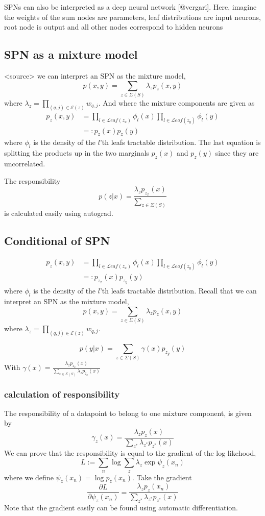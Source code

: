 SPNs can also be interpreted as a deep neural network [@vergari]. Here, imagine the
weights of the sum nodes are parameters, leaf distributions are input neurons, root node is output and
all other nodes correspond to hidden neurons

\subsection{SPN as a mixture model}
<source> we can interpret an SPN as the mixture model, 
$$p(x,y) = \sum_{z \in \Sigma(S)} \lambda_z p_z(x,y)$$
where $\lambda_z = \prod_{(q,j) \in \mathcal{E}(z)} w_{q,j}$. And where
the mixture components are given as 
\begin{align*}
    p_z(x,y) &= \prod_{l \in \mathcal{L}eaf(z_x)} \phi_l(x)\prod_{l \in \mathcal{L}eaf(z_y)} \phi_l(y)\\
            &=: p_{z}(x) p_{z}(y) 
\end{align*}
where $\phi_l$ is the density of the $l$'th leafs tractable distribution. The last equation
is splitting the products up in the two marginals $p_z(x)$ and $p_z(y)$ since they are uncorrelated. 

The responsibility 
$$p(z|x) = \frac{ \lambda_z p_{z_x}(x)}{\sum_{z \in \Sigma(S)} }$$
is calculated easily using autograd. 

\subsection{Conditional of SPN}
\begin{align*}
    p_z(x,y) &= \prod_{l \in \mathcal{L}eaf(z_x)} \phi_l(x)\prod_{l \in \mathcal{L}eaf(z_y)} \phi_l(y)\\
            &=: p_{z_x}(x) p_{z_y}(y) 
\end{align*}
where $\phi_l$ is the density of the $l$'th leafs tractable distribution. Recall that we can interpret an SPN
as the mixture model, 
$$p(x,y) = \sum_{z \in \Sigma(S)} \lambda_z p_z(x,y)$$
where $\lambda_z = \prod_{(q,j) \in \mathcal{E}(z)} w_{q,j}$.

$$p(y|x)=\sum_{z \in \Sigma(S)} \gamma(x) p_{z_y}(y)$$
With $\gamma(x) = \frac{ \lambda_z p_{z_x}(x)}{\sum_{z \in \Sigma(S)} \lambda_z p_{z_x}(x)}$ 

\subsubsection{calculation of responsibility}
The responsibility of a datapoint to belong to one mixture component, is given by
$$\gamma_z(x) = \frac{\lambda_z p_z(x)}{\sum_{z^*} \lambda_{z^*} p_{z^*}(x)}$$
We can prove that the responsibility is equal to the gradient of the log likehood, 
$$L:= \sum_n \log \sum_z \lambda_z \exp \psi_z(x_n)$$
where we define $\psi_z(x_n) = \log p_z(x_n)$. Take the gradient 
$$\frac{\partial L}{\partial \psi_{z}(x_{n})} = \frac{\lambda_z p_z(x_n)}{\sum_{z^*} \lambda_{z^*} p_{z^*}(x)}$$
Note that the gradient easily can be found using automatic differentiation. 

